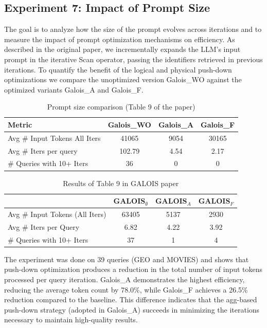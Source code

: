 \documentclass[11pt]{article}
\begin{document}
\subsection{Experiment 7: Impact of Prompt Size}

The goal is to analyze how the size of the prompt evolves across iterations and to measure the impact of prompt optimization mechanisms on efficiency. As described in the original paper, we incrementally expands the LLM’s input prompt in the iterative Scan operator, passing the identifiers retrieved in previous iterations. To quantify the benefit of the logical and physical push-down optimizations we compare the unoptimized version Galois\_WO against the optimized variants Galois\_A and Galois\_F.

\begin{table}[h!]
\centering
\caption{Prompt size comparison (Table 9 of the paper)}
\begin{tabular}{lccc}
\hline
Metric & Galois\_WO & Galois\_A & Galois\_F \\
\hline
Avg \# Input Tokens All Iters & 41065 & 9054 & 30165 \\
Avg \# Iters per query        & 102.79  & 4.54 & 2.17  \\
\# Queries with 10+ Iters      & 36     & 0    & 0     \\
\hline
\end{tabular}
\end{table}

\begin{table}[htbp]
\centering
\caption{Results of Table 9 in GALOIS paper}
\label{tab:iters_tokens_stats}
\begin{tabular}{lccc}
\hline
 & \textbf{GALOIS$_{\emptyset}$} & \textbf{GALOIS$_A$} & \textbf{GALOIS$_F$} \\
\hline
Avg \# Input Tokens (All Iters) & 63405 & 5137 & 2930 \\
Avg \# Iters per Query          & 6.82  & 4.22 & 3.92 \\
\# Queries with 10+ Iters       & 37    & 1    & 4 \\
\hline
\end{tabular}
\end{table}

The experiment was done on 39 queries (GEO and MOVIES) and shows that push-down optimization produces a reduction in the total number of input tokens processed per query iteration. Galois\_A demonstrates the highest efficiency, reducing the average token count by 78.0\%, while Galois\_F achieves a 26.5\% reduction compared to the baseline. This difference indicates that the agg-based push-down strategy (adopted in Galois\_A) succeeds in minimizing the iterations necessary to maintain high-quality results.
\end{document}
